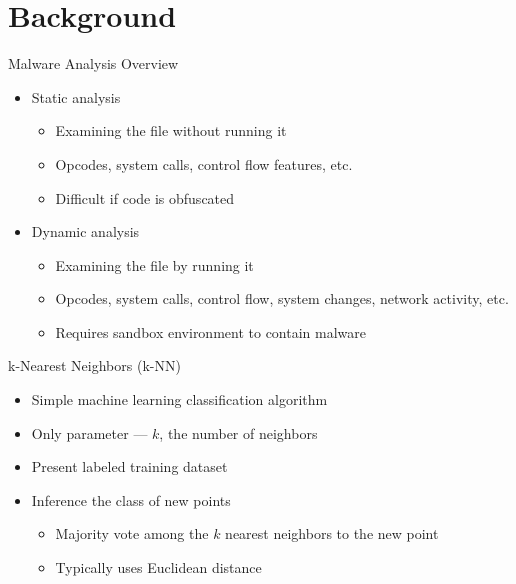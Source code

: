 \documentclass[handout,11pt]{beamer}
\begin{document}
	\section{Background}
	\begin{frame}{Malware Analysis Overview}
		\begin{itemize}
			\item Static analysis
				\begin{itemize}
					\item Examining the file without running it
					\item Opcodes, system calls, control flow features, etc.
					\item Difficult if code is obfuscated
				\end{itemize}
			\item Dynamic analysis
				\begin{itemize}
					\item Examining the file by running it
					\item Opcodes, system calls, control flow, system changes, network
						activity, etc.
					\item Requires sandbox environment to contain malware
				\end{itemize}
		\end{itemize}
	\end{frame}
	\begin{frame}{k-Nearest Neighbors (k-NN)}
		\begin{itemize}
			\item Simple machine learning classification algorithm
			\item Only parameter --- $k$, the number of neighbors
			\item Present labeled training dataset
			\item Inference the class of new points
				\begin{itemize}
					\item Majority vote among the $k$ nearest neighbors to the new point
					\item Typically uses Euclidean distance
				\end{itemize}
		\end{itemize}
	\end{frame}
\end{document}
